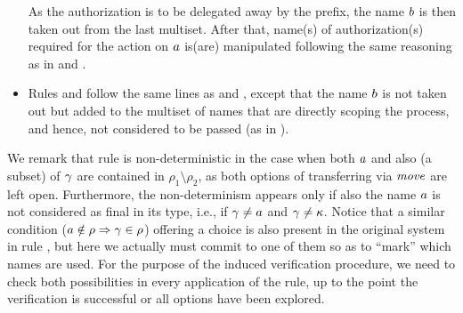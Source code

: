 \begin{itemize}
As the authorization is to be delegated away by the prefix, the name $b$ is then taken out from the last multiset. %
After that, name(s) of authorization(s) required for the action on $a$ is(are) manipulated following the same reasoning as in  and .
\item 
Rules  and  follow the same lines as  and , except that the name $b$ is not taken out but added to the multiset of names that are directly scoping the process, and hence, not considered to be passed (as in ).
\end{itemize}

We remark that rule  is non-deterministic 
in the case when both $a$ and also (a subset) of $\gamma$ are contained in $\rho_1\setminus\rho_2$, as both options of transferring via $\mathit{move}$ are left open. Furthermore, the non-determinism appears only if also the name $a$ is not considered as final in its type, i.e., if $\gamma\not=a$ and $\gamma\not={\mathbf{\kappa}}$.
Notice that a similar condition ($a\notin\rho\Rightarrow \gamma\in\rho$) offering a choice is also present in the original system in rule , but here we actually must commit to one of them so as to ``mark'' which names are used. 
%
For the purpose of the induced verification procedure, we need to check both possibilities in every application of the rule, up to the point the verification is successful or all options have been explored. 


